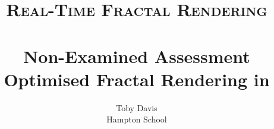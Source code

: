 \documentclass[12pt]{article}
\author{Toby Davis\\[0.2cm]Hampton School}
\title{
	\textsc{Real-Time Fractal Rendering}\\[2.2cm]
	\\
	
	{\LARGE \bfseries
		Non-Examined Assessment}\\
	{\Large\bfseries
		Optimised Fractal Rendering in}
}
\begin{document}
	
	
	
	\pagebreak
	
	
\end{document}
